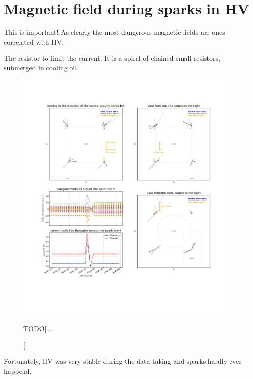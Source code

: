 

\section{Magnetic field during sparks in HV}


This is important! As clearly the most dangerous magnetic fields are ones correlated with HV.

The resistor to limit the current. It is a spiral of chained small resistors, submerged in cooling oil.

\begin{figure}
  \centering
  \includegraphics[width=\linewidth]{gfx/nEDM_SFC/SFC_during_spark_event_thesis.pdf}
  \caption
  [TODO]
  {\ldots}
  \label{fig:field_when_sparking}
\end{figure}


Fortunately, HV was very stable during the data taking and sparks hardly ever happend.










